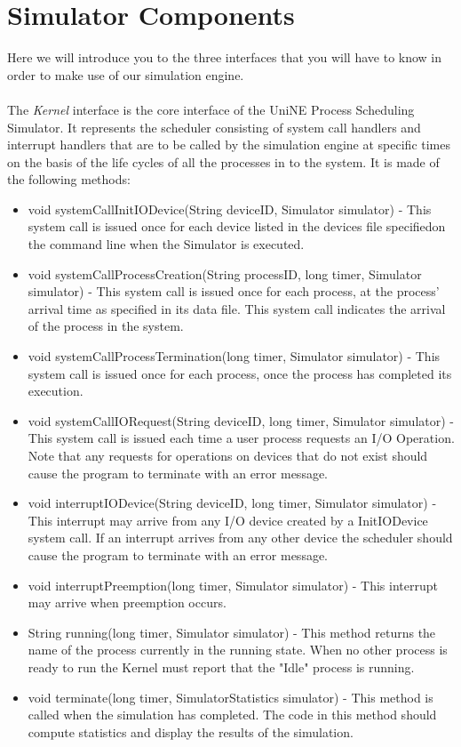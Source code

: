 \documentclass[11pt,a4paper]{scrreprt}
\begin{document}
\section{Simulator Components}
Here we will introduce you to the three interfaces that you will have to know in order to make use of our simulation engine.\\\\
The \textit{Kernel} interface is the core interface of the UniNE Process Scheduling Simulator. It represents the scheduler consisting of system call handlers and interrupt handlers that are to be called by the simulation engine at specific times on the basis of the life cycles of all the processes in to the system. It is made of the following methods: 
\begin{itemize}
\item void systemCallInitIODevice(String deviceID, Simulator simulator) - This system call is issued once for each device listed in the devices file specifiedon the command line when the Simulator is executed.
\item void systemCallProcessCreation(String processID, long timer, Simulator simulator) - This system call is issued once for each process, at the process' arrival time as specified in its data file. This system call indicates the arrival of the process in the system.
\item void systemCallProcessTermination(long timer, Simulator simulator) - This system call is issued once for each process, once the process has completed its execution.
\item void systemCallIORequest(String deviceID, long timer, Simulator simulator) - This system call is issued each time a user process requests an I/O Operation. Note that any requests for operations on devices that do not exist should cause the program to terminate with an error message.
\item void interruptIODevice(String deviceID, long timer, Simulator simulator) - This interrupt may arrive from any I/O device created by a InitIODevice system call. If an interrupt arrives from any other device the scheduler should cause the program to terminate with an error message.
\item void interruptPreemption(long timer, Simulator simulator) - This interrupt may arrive when preemption occurs.
\item String running(long timer, Simulator simulator) - This method returns the name of the process currently in the running state. When no other process is ready to run the Kernel must report that the "Idle" process is running.
\item void terminate(long timer, SimulatorStatistics simulator) - This method is called when the simulation has completed. The code in this method should compute statistics and display the results of the simulation.
\end{itemize}
\end{document}

